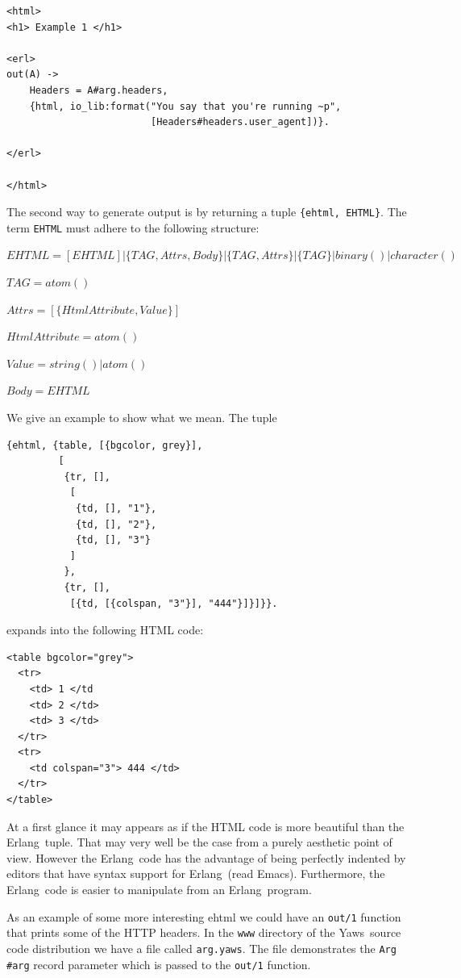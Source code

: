 \documentclass[11pt,oneside,english]{book}
\newcommand{\Erlang}            %
        {{\sc Erlang}}
\newcommand{\Yaws}            %
        {{\sc Yaws}}
\begin{document}
\begin{verbatim}
<html>
<h1> Example 1 </h1>

<erl>
out(A) ->
    Headers = A#arg.headers,
    {html, io_lib:format("You say that you're running ~p",
                         [Headers#headers.user_agent])}.

</erl>

</html>

\end{verbatim}


The second way to generate output is by returning a tuple
\verb+{ehtml, EHTML}+. The term \verb+EHTML+ must adhere to the
following structure:

$EHTML = [EHTML] | \{TAG, Attrs, Body\} |
                   \{TAG, Attrs\} | \{TAG\} |
        binary() | character()$

$TAG         = atom()$

$Attrs = [\{HtmlAttribute, Value\}]$

$HtmlAttribute   = atom()$

$Value = string() | atom()$

$Body  = EHTML$

We give an example to show what we mean. The tuple

\begin{verbatim}
{ehtml, {table, [{bgcolor, grey}],
         [
          {tr, [],
           [
            {td, [], "1"},
            {td, [], "2"},
            {td, [], "3"}
           ]
          },
          {tr, [],
           [{td, [{colspan, "3"}], "444"}]}]}}.
\end{verbatim}

expands into the following HTML code:

\begin{verbatim}
<table bgcolor="grey">
  <tr>
    <td> 1 </td
    <td> 2 </td>
    <td> 3 </td>
  </tr>
  <tr>
    <td colspan="3"> 444 </td>
  </tr>
</table>

\end{verbatim}

At a first glance it may appears as if the HTML code is more
beautiful than the \Erlang\  tuple. That may very well be the
case from a purely aesthetic point of view. However the
\Erlang\  code has the advantage of being perfectly indented by editors
that have syntax support for \Erlang\  (read Emacs). Furthermore, the \Erlang\
code is easier to manipulate from an \Erlang\  program.

As an example of some more interesting ehtml we could have an
\verb+out/1+ function that prints some of the HTTP headers.  In the
\verb+www+ directory of the \Yaws\ source code distribution we have a
file called \verb+arg.yaws+. The file demonstrates the \verb+Arg+
\verb+#arg+ record parameter which is passed to the \verb+out/1+
function.
\end{document}
